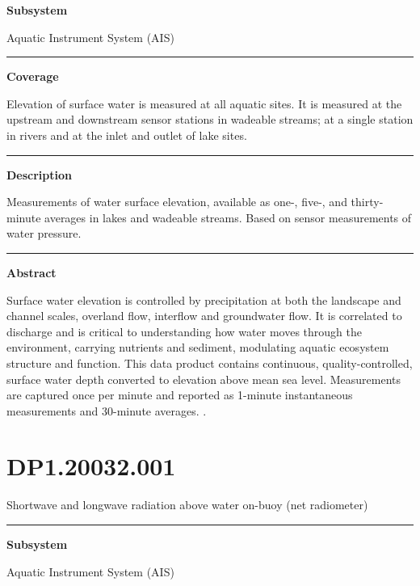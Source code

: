 \documentclass[]{article}
\begin{document}
\textbf{Subsystem}

Aquatic Instrument System (AIS)

\begin{center}\rule{0.5\linewidth}{\linethickness}\end{center}

\textbf{Coverage}

Elevation of surface water is measured at all aquatic sites. It is
measured at the upstream and downstream sensor stations in wadeable
streams; at a single station in rivers and at the inlet and outlet of
lake sites.

\begin{center}\rule{0.5\linewidth}{\linethickness}\end{center}

\textbf{Description}

Measurements of water surface elevation, available as one-, five-, and
thirty-minute averages in lakes and wadeable streams. Based on sensor
measurements of water pressure.

\begin{center}\rule{0.5\linewidth}{\linethickness}\end{center}

\textbf{Abstract}

Surface water elevation is controlled by precipitation at both the
landscape and channel scales, overland flow, interflow and groundwater
flow. It is correlated to discharge and is critical to understanding how
water moves through the environment, carrying nutrients and sediment,
modulating aquatic ecosystem structure and function. This data product
contains continuous, quality-controlled, surface water depth converted
to elevation above mean sea level. Measurements are captured once per
minute and reported as 1-minute instantaneous measurements and 30-minute
averages. \newpage
.

\section{DP1.20032.001}\label{dp1.20032.001}

Shortwave and longwave radiation above water on-buoy (net radiometer)

\begin{center}\rule{0.5\linewidth}{\linethickness}\end{center}

\textbf{Subsystem}

Aquatic Instrument System (AIS)
\end{document}
